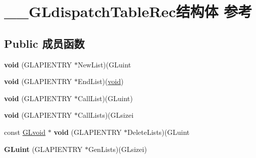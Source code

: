 \hypertarget{struct_____g_ldispatch_table_rec}{}\section{\+\_\+\+\_\+\+G\+Ldispatch\+Table\+Rec结构体 参考}
\label{struct_____g_ldispatch_table_rec}
\subsection*{Public 成员函数}
\begin{DoxyCompactItemize}
\item 
\mbox{\label{struct_____g_ldispatch_table_rec_a5caf6c79df40dacbfab8650e813b4557}} 
{\bfseries void} (G\+L\+A\+P\+I\+E\+N\+T\+RY $\ast$New\+List)(G\+Luint
\item 
\mbox{\label{struct_____g_ldispatch_table_rec_aab58806dfbfe6ca750141654c9d86860}} 
{\bfseries void} (G\+L\+A\+P\+I\+E\+N\+T\+RY $\ast$End\+List)(\hyperlink{interfacevoid}{void})
\item 
\mbox{\label{struct_____g_ldispatch_table_rec_a4bd8c3e9cfc907787645851a8f742f05}} 
{\bfseries void} (G\+L\+A\+P\+I\+E\+N\+T\+RY $\ast$Call\+List)(G\+Luint)
\item 
\mbox{\label{struct_____g_ldispatch_table_rec_adba02cb03e56d8bb436a413f0241e565}} 
{\bfseries void} (G\+L\+A\+P\+I\+E\+N\+T\+RY $\ast$Call\+Lists)(G\+Lsizei
\item 
\mbox{\label{struct_____g_ldispatch_table_rec_a7014248b963a75c54c89096fd2f835ec}} 
const \hyperlink{interfacevoid}{G\+Lvoid} $\ast$ {\bfseries void} (G\+L\+A\+P\+I\+E\+N\+T\+RY $\ast$Delete\+Lists)(G\+Luint
\item 
\mbox{\label{struct_____g_ldispatch_table_rec_a061d2a7fa249ec07de966c0b1e1477ae}} 
{\bfseries G\+Luint} (G\+L\+A\+P\+I\+E\+N\+T\+RY $\ast$Gen\+Lists)(G\+Lsizei)
\item 
\mbox{\label{struct_____g_ldispatch_table_rec_ad595892a36cdc41d6f2cd0e7406bd292}} 

\end{DoxyCompactItemize}
